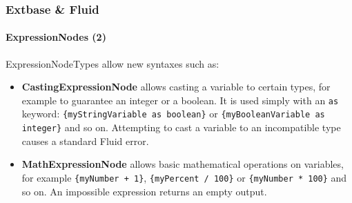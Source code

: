 
\begin{frame}[fragile]
	\frametitle{Extbase \& Fluid}
	\framesubtitle{ExpressionNodes (2)}

	ExpressionNodeTypes allow new syntaxes such as:

	\begin{itemize}

		\item \textbf{CastingExpressionNode}\newline
			\small
				allows casting a variable to certain types, for example to guarantee
				an integer or a boolean. It is used simply with an \texttt{as} keyword:
				\texttt{\{myStringVariable as boolean\}} or
				\texttt{\{myBooleanVariable as integer\}} and so on.
				Attempting to cast a variable to an incompatible type causes a standard
				Fluid error.
			\normalsize

		\item \textbf{MathExpressionNode}\newline
			\small
				allows basic mathematical operations on variables, for example
				\texttt{\{myNumber + 1\}}, \texttt{\{myPercent / 100\}} or
				\texttt{\{myNumber * 100\}} and so on.
				An impossible expression returns an empty output.
			\normalsize

	\end{itemize}

\end{frame}


